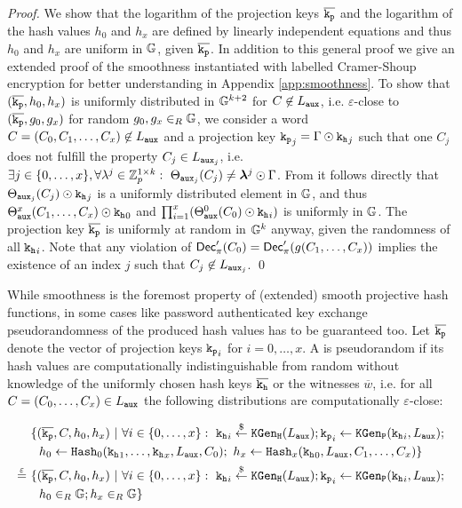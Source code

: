 \begin{proof}
We show that the logarithm of the projection keys $\overline{\mathtt{k_p}}$ and the logarithm of the hash values $h_0$ and $h_x$ are defined by linearly independent equations and thus $h_0$ and $h_x$ are uniform in $\mathbb{G}$, given $\overline{\mathtt{k_p}}$.
In addition to this general proof we give an extended proof of the \SPHFF smoothness instantiated with labelled Cramer-Shoup encryption for better understanding in Appendix \ref{app:smoothness}.
To show that $(\overline{\mathtt{k_p}},h_0,h_x)$ is uniformly distributed in $\mathbb{G}^{k+2}$ for $C\not\in L_\mathtt{aux}$, i.e. $\varepsilon$-close to $(\overline{\mathtt{k_p}},g_0,g_x)$ for random $g_0,g_x\in_R\mathbb{G}$, we consider a word $C=(C_0,C_1,\dots,C_x)\not\in L_\mathtt{aux}$ and a projection key $\mathtt{k_p}_j=\Gamma \odot \mathtt{k_h}_j$ such that one $C_j$ does not fulfill the property $C_j\in L_{\mathtt{aux}_j}$, i.e. $\exists j\in\{0,\dots,x\},\forall\lambda^j\in\mathbb{Z}_p^{1\times k}:~\Theta_{\mathtt{aux}_j}(C_j)\not=\bm{\lambda}^j\odot \Gamma$.
From \cite[Appendix D.3]{cryptoeprint:2013:034} it follows directly that $\Theta_{\mathtt{aux}_j}(C_j)\odot\mathtt{k_h}_j$ is a uniformly distributed element in $\mathbb{G}$, and thus $\Theta^x_{\mathtt{aux}}(C_1,\dots,C_x)\odot\mathtt{k_h}_0$ and $\prod^{x}_{i=1}(\Theta_{\mathtt{aux}}^0(C_0)\odot\mathtt{k_h}_i)$ is uniformly in $\mathbb{G}$.
The projection key $\overline{\mathtt{k_p}}$ is uniformly at random in $\mathbb{G}^{k}$ anyway, given the randomness of all $\mathtt{k_h}_i$.
Note that any violation of $\mathsf{Dec}'_{\pi}(C_0)=\mathsf{Dec}'_{\pi}(g(C_1,\dots,C_x))$ implies the existence of an index $j$ such that $C_j\not\in L_{\mathtt{aux}_j}$.
\qed
\end{proof}

\noindent
While smoothness is the foremost property of (extended) smooth projective hash functions, in some cases like password authenticated key exchange pseudorandomness of the produced hash values has to be guaranteed too.
Let $\overline{\mathtt{k_p}}$ denote the vector of projection keys $\mathtt{k_p}_i$ for $i=0,\dots,x$.
A \SPHFF is pseudorandom if its hash values are computationally indistinguishable from random without knowledge of the uniformly chosen hash keys $\overline{\mathtt{k_h}}$ or the witnesses $\overline{w}$, i.e. for all $C=(C_0,\dots,C_x)\in L_\mathtt{aux}$ the following distributions are computationally $\varepsilon$-close:

\begin{align*}
& \{(\overline{\mathtt{k_p}},C,h_0,h_x) ~|~ \forall i\in\{0,\dots,x\}:~ \mathtt{k_h}_i\stackrel{\$}{\gets}\mathtt{KGen_H}(L_\mathtt{aux}); \mathtt{k_p}_i\gets\mathtt{KGen_P}(\mathtt{k_h}_i,L_\mathtt{aux}); \\
& ~~h_0\gets\mathtt{Hash}_0(\mathtt{k_h}_1,\dots,\mathtt{k_h}_x,L_\mathtt{aux},C_0);~ h_x\gets\mathtt{Hash}_x(\mathtt{k_h}_0,L_\mathtt{aux},C_1,\dots,C_x)\} \\
\stackrel{\varepsilon}{=}~ & \{(\overline{\mathtt{k_p}},C,h_0,h_x) ~|~ \forall i\in\{0,\dots,x\}:~ \mathtt{k_h}_i\stackrel{\$}{\gets}\mathtt{KGen_H}(L_\mathtt{aux}); \mathtt{k_p}_i\gets\mathtt{KGen_P}(\mathtt{k_h}_i,L_\mathtt{aux}); \\
& ~~ h_0\in_R\mathbb{G}; h_x\in_R\mathbb{G}\}
\end{align*}


